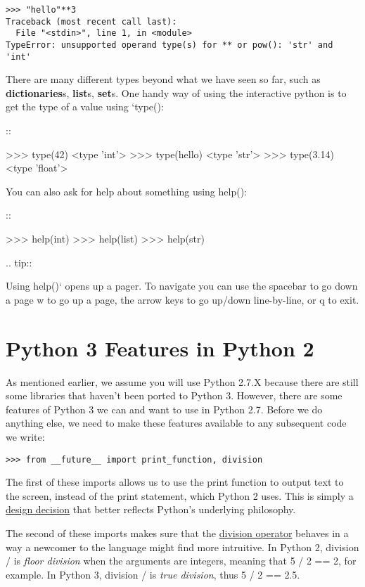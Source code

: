\begin{verbatim}
>>> "hello"**3
Traceback (most recent call last):
  File "<stdin>", line 1, in <module>
TypeError: unsupported operand type(s) for ** or pow(): 'str' and 'int'
\end{verbatim}

There are many different types beyond what we have seen so far, such as
\textbf{dictionaries}s, \textbf{list}s, \textbf{set}s. One handy way of
using the interactive python is to get the type of a value using
`type():

::

   \textgreater{}\textgreater{}\textgreater{} type(42)
   \textless{}type 'int'\textgreater{}
   \textgreater{}\textgreater{}\textgreater{} type(hello)
   \textless{}type 'str'\textgreater{}
   \textgreater{}\textgreater{}\textgreater{} type(3.14)
   \textless{}type 'float'\textgreater{}

You can also ask for help about something using help():

::

   \textgreater{}\textgreater{}\textgreater{} help(int)
   \textgreater{}\textgreater{}\textgreater{} help(list)
   \textgreater{}\textgreater{}\textgreater{} help(str)

.. tip::

   Using help()` opens up a pager. To navigate you can use the spacebar
to go down a page w to go up a page, the arrow keys to go up/down
line-by-line, or q to exit.

\section{Python 3 Features in Python 2}\label{python-3-features-in-python-2}


As mentioned earlier, we assume you will use Python 2.7.X because there
are still some libraries that haven't been ported to Python 3. However,
there are some features of Python 3 we can and want to use in Python
2.7. Before we do anything else, we need to make these features
available to any subsequent code we write:

\begin{verbatim}
>>> from __future__ import print_function, division
\end{verbatim}

The first of these imports allows us to use the print function to output
text to the screen, instead of the print statement, which Python 2 uses.
This is simply a \href{https://www.python.org/dev/peps/pep-3105/}{design
decision} that better reflects Python's underlying philosophy.

The second of these imports makes sure that the
\href{https://www.python.org/dev/peps/pep-0238/}{division operator}
behaves in a way a newcomer to the language might find more intruitive.
In Python 2, division / is \emph{floor division} when the arguments are
integers, meaning that 5 / 2 == 2, for example. In Python 3, division /
is \emph{true division}, thus 5 / 2 == 2.5.
